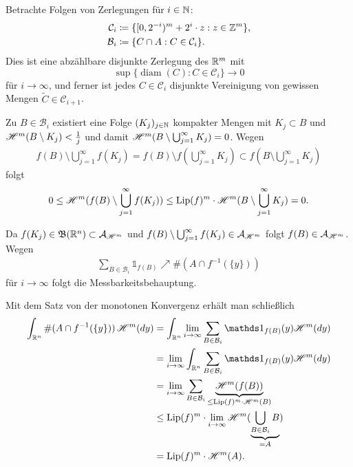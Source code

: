 \documentclass[a4paper,twoside,DIV15,BCOR12mm]{scrbook}
\newcommand{\A}{\mathcal A}
\newcommand{\borel}{\mathfrak B}
\newcommand{\ind}{\mathds 1}
\newcommand{\HM}{\H}
\DeclareMathOperator{\diam}{diam}
\DeclareMathOperator{\Lip}{Lip}
\begin{document}
\begin{beweis}
Betrachte Folgen von Zerlegungen für $i\in \mathbb{N}$:
\begin{align*}
\mathcal C_i &\da  \{[0,2^{-i})^m + 2^i \cdot z: z \in \MdZ^m\},\\
\mathcal B_i &\da  \{C\cap A : C \in \mathcal C_i\}.
\end{align*}
Dies ist eine abzählbare disjunkte Zerlegung des $\mathbb{R}^m$ mit
\[
\sup\{\diam(C): C\in\mathcal C_i\} \to 0
\]
für $i\to \infty$, und ferner ist jedes $C\in\mathcal C_i$ disjunkte Vereinigung von gewissen Mengen 
$\tilde C\in\mathcal C_{i+1}$.

Zu $B\in\mathcal B_i$ existiert eine Folge $(K_j)_{j\in \mathbb{N}}$ kompakter Mengen mit $K_j \subset B$ und $\HM^m(B\setminus K_j) < \frac 1j$ und damit $\HM^m(B\setminus\bigcup_{j=1}^\infty K_j) = 0$.
Wegen 
\begin{align*}
f(B) \setminus \bigcup_{j=1}^\infty f(K_j) = f(B) \setminus f(\bigcup_{j=1}^\infty K_j) \subset f(B\setminus \bigcup_{j=1}^\infty K_j)
\end{align*}
folgt
\begin{align*}
0 \le \HM^m(f(B) \setminus \bigcup_{j=1}^\infty f(K_j)) \le \Lip(f)^m \cdot \HM^m(B\setminus \bigcup_{j=1}^\infty K_j) = 0.
\end{align*}

Da $f(K_j) \in \borel(\MdR^n) \subset \A_{\HM^m}$ und $f(B)\setminus \bigcup_{j=1}^\infty f(K_j) \in \A_{\HM^m}$ folgt $f(B) \in \A_{\HM^m}$. Wegen
\begin{align*}
\sum_{B\in\mathcal B_i} \ind_{f(B)} \nearrow \#(A\cap f^{-1}(\{y\}))
\end{align*}
für $i\to \infty$  folgt die Messbarkeitsbehauptung.

Mit dem Satz von der monotonen Konvergenz erhält man schließlich
\begin{align*}
\int_{\MdR^n} \#(A \cap f^{-1}(\{y\}) )\, \HM^m(dy) 
&= \int_{\MdR^n} \lim_{i\to\infty} \sum_{B\in\mathcal B_i} \ind_{f(B)}(y) \HM^m(dy) \\
&= \lim_{i\to\infty} \int_{\MdR^n}\sum_{B\in\mathcal B_i}\ind_{f(B)}(y) \HM^m(dy) \\
&= \lim_{i\to\infty} \sum_{B\in\mathcal B_i} \underbrace{\HM^m(f(B))}_{\le \Lip(f)^m\cdot \HM^m(B)}\\
&\le \Lip(f)^m \cdot \lim_{i\to\infty} \HM^m(\underbrace{\bigcup_{B\in\mathcal B_i} B}_{=A}) \\
&=   \Lip(f)^m \cdot \HM^m(A).
\end{align*}
\end{beweis}
\end{document}
